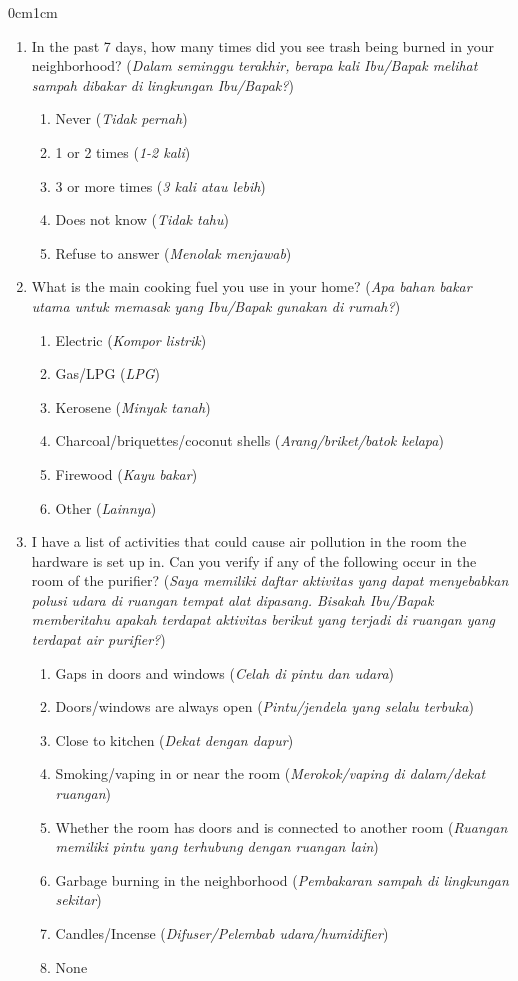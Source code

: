 \documentclass[9pt,twoside,lineno]{pnas-new}
\begin{document}
\begin{adjustwidth}{0cm}{1cm}
\begin{enumerate}
    \item In the past 7 days, how many times did you see trash being burned in your neighborhood? (\textit{Dalam seminggu terakhir, berapa kali Ibu/Bapak melihat sampah dibakar di lingkungan Ibu/Bapak?})
    \begin{enumerate}
        \item Never (\textit{Tidak pernah})
        \item 1 or 2 times (\textit{1-2 kali})
        \item 3 or more times (\textit{3 kali atau lebih})
        \item Does not know (\textit{Tidak tahu})
        \item Refuse to answer (\textit{Menolak menjawab})
    \end{enumerate}
    \item What is the main cooking fuel you use in your home? (\textit{Apa bahan bakar utama untuk memasak yang Ibu/Bapak gunakan di rumah?})
    \begin{enumerate}
        \item Electric (\textit{Kompor listrik})
        \item Gas/LPG (\textit{LPG})
        \item Kerosene (\textit{Minyak tanah})
        \item Charcoal/briquettes/coconut shells (\textit{Arang/briket/batok kelapa})
        \item Firewood (\textit{Kayu bakar})
        \item Other (\textit{Lainnya})
    \end{enumerate}

    
    \item I have a list of activities that could cause air pollution in the room the hardware is set up in. Can you verify if any of the following occur in the room of the purifier? (\textit{Saya memiliki daftar aktivitas yang dapat menyebabkan polusi udara di ruangan tempat alat dipasang. Bisakah Ibu/Bapak memberitahu apakah terdapat aktivitas berikut yang terjadi di ruangan yang terdapat air purifier?})
    \begin{enumerate}
        \item Gaps in doors and windows (\textit{Celah di pintu dan udara})
        \item Doors/windows are always open (\textit{Pintu/jendela yang selalu terbuka})
        \item Close to kitchen (\textit{Dekat dengan dapur})
        \item Smoking/vaping in or near the room (\textit{Merokok/vaping di dalam/dekat ruangan})
        \item Whether the room has doors and is connected to another room (\textit{Ruangan memiliki pintu yang terhubung dengan ruangan lain})
        \item Garbage burning in the neighborhood (\textit{Pembakaran sampah di lingkungan sekitar})
        \item Candles/Incense (\textit{Difuser/Pelembab udara/humidifier})
        \item None
    \end{enumerate}


\end{enumerate}
\end{adjustwidth}
\end{document}
